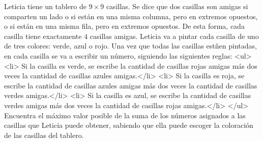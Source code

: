 Leticia tiene un tablero de $9\times 9$ casillas. Se dice que dos casillas son amigas si comparten un lado o si están en una misma columna, pero en extremos opuestos, o si están en una misma fila, pero en extremos opuestos. De esta forma, cada casilla tiene exactamente $4$ casillas amigas. Leticia va a pintar cada casilla de uno de tres colores: verde, azul o rojo. Una vez que todas las casillas estñen pintadas, en cada casilla se va a escribir un número, siguiendo las siguientes reglas:
<ul>
<li> Si la casilla es verde, se escribe la cantidad de casillas rojas amigas más dos veces la cantidad de casillas azules amigas.</li>
<li> Si la casilla es roja, se escribe la cantidad de casillas azules amigas más dos veces la cantidad de casillas verdes amigas.</li>
<li> Si la casilla es azul, se escribe la cantidad de casillas verdes amigas más dos veces la cantidad de casillas rojas amigas.</li>
</ul>
Encuentra el máximo valor posible de la suma de los números asignados a las casillas que Leticia puede obtener, sabiendo que ella puede escoger la coloración de las casillas del tablero.
